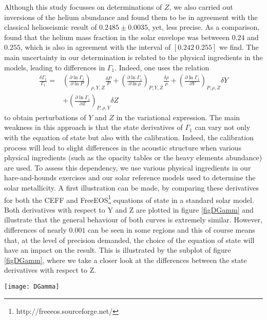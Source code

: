 \documentclass[a4paper,fleqn,usenatbib]{mnras}
\begin{document}
Although this study focusses on determinations of $Z$, we also carried out inversions of the helium abundance and found them to be in agreement with the classical helioseismic result of $0.2485\pm0.0035$, yet, less precise. As a comparison, \citet{Vorontsov} found that the helium mass fraction in the solar envelope was betweeen $0.24$ and $0.255$, which is also in agreement with the interval of $\left[0.242 \: 0.255 \right]$ we find. The main uncertainty in our determination is related to the physical ingredients in the models, leading to differences in $\Gamma_{1}$. Indeed, one uses the relation
\begin{align}
\frac{\delta \Gamma_{1}}{\Gamma_{1}}=&\left(\frac{\partial \ln \Gamma_{1}}{\partial \ln P}\right)_{\rho,Y,Z}\frac{\delta P}{P} + \left(\frac{\partial \ln \Gamma_{1}}{\partial \ln \rho}\right)_{P,Y,Z}\frac{\delta \rho}{\rho} + \left(\frac{\partial \ln \Gamma_{1}}{\partial Y}\right)_{P,\rho,Z} \delta Y \nonumber \\ 
&+ \left(\frac{\partial \ln \Gamma_{1}}{\partial Z}\right)_{P,\rho,Y} \delta Z \label{eq:Gamma1Eos}
\end{align}
to obtain perturbations of $Y$ and $Z$ in the variational expression. The main weakness in this approach is that the state derivatives of $\Gamma_{1}$ can vary not only with the equation of state but also with the calibration. Indeed, the calibration process will lead to slight differences in the acoustic structure when various physical ingredients (such as the opacity tables or the heavy elements abundance) are used. To assess this dependency, we use various physical ingredients in our hare-and-hounds exercises and our solar reference models used to determine the solar metallicity. A first illustration can be made, by comparing these derivatives for both the CEFF \citep{CEFF} and FreeEOS\footnote{http://freeeos.sourceforge.net/}\citep{Irwin} equations of state in a standard solar model. Both derivatives with respect to Y and Z are plotted in figure \ref{figDGamm} and illustrate that the general behaviour of both curves is extremely similar. However, differences of nearly $0.001$ can be seen in some regions and this of course means that, at the level of precision demanded, the choice of the equation of state will have an impact on the result. This is illustrated by the subplot of figure \ref{figDGamm}, where we take a closer look at the differences between the state derivatives with respect to Z.
\begin{figure*}
	\centering
		\texttt{[image: DGamma]}
	\caption{(Green and red curves) State derivatives of the natural logarithm of $\Gamma_{1}$ with respect to $Y$ for the FreeEOS and CEFF equations of state. (Magenta and blue curves) State derivatives of the natural logarithm of $\Gamma_{1}$ with respect to $Z$ for the FreeEOS and CEFF equations of state.}
		\label{figDGamm}
\end{figure*} 
\end{document}
